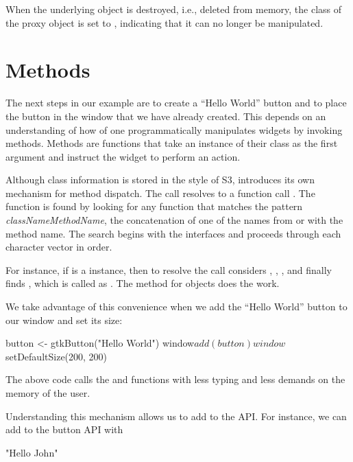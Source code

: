 When the underlying \GTK\/ object is destroyed, i.e., deleted
from memory, the class of the proxy object is set to ,
indicating that it can no longer be manipulated.

\section{Methods}

The next steps in our example are to create a ``Hello World'' button
and to place the button in the window that we have already
created. This depends on an understanding of how of one
programmatically manipulates widgets by invoking methods.  Methods are
functions that take an instance of their class as the first argument
and instruct the widget to perform an action.

Although class information is stored in the style of S3, 
introduces its own mechanism for method dispatch.  The call
  resolves to a function call
. The function is found by looking for any function
that matches the pattern \emph{classNameMethodName}, the concatenation
of one of the names from  or 
with the method name. The search begins with the interfaces and
proceeds through each character vector in order.

For instance, if  is a  instance, then
to resolve the call   considers
, ,
,  and finally finds
, which is called as
. The  method
for  objects does the work.

We take advantage of this convenience when we add the ``Hello World''
button to our window and set its size:
\begin{Schunk}
\begin{Sinput}
 button <- gtkButton("Hello World")
 window$add(button)
 window$setDefaultSize(200, 200)
\end{Sinput}
\end{Schunk}
%
The above code calls the  and
 functions with less typing and less
demands on the memory of the user.

Understanding this mechanism allows us to add to the 
API. For instance, we can add to the button API with
\begin{Schunk}
\begin{Soutput}
[1] "Hello John"
\end{Soutput}
\end{Schunk}

